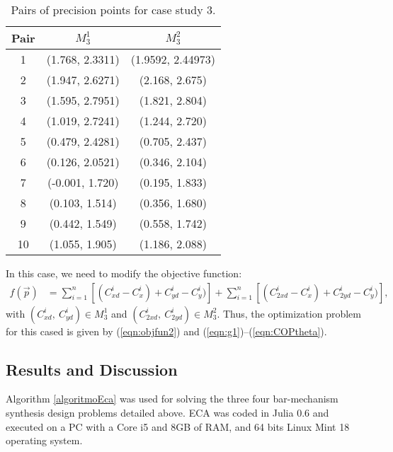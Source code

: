 \documentclass[12pt,letterpape]{article}
\begin{document}
\begin{itemize}
\begin{table}[!ht]
	\centering
	\begin{tabular}{ccc}
			\hline
			Pair  &    $M_{3}^1$    &    $M_{3}^2$      \\
			\hline
			1 & (1.768, 2.3311) & (1.9592, 2.44973) \\
			2 & (1.947, 2.6271) & (2.168, 2.675)    \\
			3 & (1.595, 2.7951) & (1.821, 2.804)    \\
			4 & (1.019, 2.7241) & (1.244, 2.720)    \\
			5 & (0.479, 2.4281) & (0.705, 2.437)    \\
			6 & (0.126, 2.0521) & (0.346, 2.104)    \\
			7 & (-0.001, 1.720) & (0.195, 1.833)    \\
			8 & (0.103, 1.514)  & (0.356, 1.680)    \\
			9 & (0.442, 1.549)  & (0.558, 1.742)    \\
		   10 & (1.055, 1.905)  & (1.186, 2.088)    \\
			\hline
	\end{tabular}
	\caption{Pairs of precision points for case study 3.}
\end{table}
In this case, we need to modify the objective function:
\begin{align}
	f(\vec{p}) &= \sum_{i=1}^n \left[ (C_{xd}^i - C_x^i) + C_{yd}^i - C_y^i) \right]
	+ \sum_{i=1}^n \left[ (C_{2xd}^i - C_x^i) + C_{2yd}^i - C_y^i) \right],
	\label{eqn:objfun2}
\end{align}
with $(C_{xd}^i,\ C_{yd}^i) \in M_3^1 $ and $(C_{2xd}^i,\ C_{2yd}^i) \in M_3^2 $.
Thus, the optimization problem for this cased is given by (\ref{eqn:objfun2}) and
 (\ref{eqn:g1})--(\ref{eqn:COPtheta}).

\end{itemize}


\subsection{Results and Discussion} %
\label{sec:results}

Algorithm \ref{algoritmoEca} was used for solving the three four bar-mechanism
synthesis design problems detailed above. ECA was coded in Julia 0.6 and executed
on a PC with a Core i5 and 8GB of RAM, and 64 bits Linux Mint 18 operating system.\\
\end{document}
